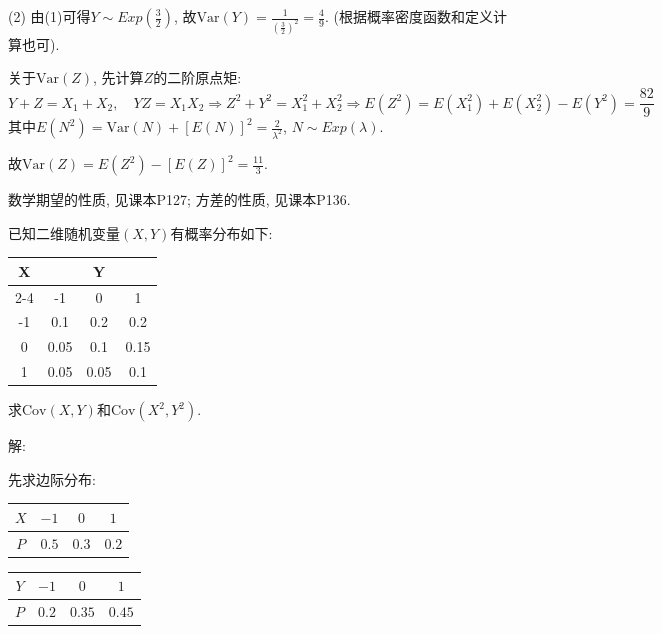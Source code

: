 \documentclass[standard]{ExBook}
\renewenvironment{shaded}{%
  \def\FrameCommand{\fboxsep=\FrameSep \colorbox{shadecolor}}%
  \MakeFramed{\advance\hsize-\width \FrameRestore}%
}{%
  \endMakeFramed
}
\begin{document}
\begin{qitems}
(2) 由(1)可得$Y\sim Exp(\displaystyle\frac{3}{2})$, 故$\displaystyle\mathrm{Var}(Y)=\frac{1}{\left(\frac{3}{2}\right)^2}=\frac{4}{9}$. (根据概率密度函数和定义计算也可).

关于$\mathrm{Var}(Z)$, 先计算$Z$的二阶原点矩:
$$Y+Z=X_1+X_2,\quad YZ=X_1 X_2 \Longrightarrow Z^2+Y^2=X_1^2+X_2^2 \Longrightarrow E(Z^2)=E(X_1^2)+E(X_2^2)-E(Y^2)=\frac{82}{9}$$
其中$E(N^2)=\mathrm{Var}(N)+\left[E(N)\right]^2=\displaystyle\frac{2}{\lambda^2}$, $N\sim Exp(\lambda)$.

故$\mathrm{Var}(Z)=E(Z^2)-\left[E(Z)\right]^2=\displaystyle\frac{11}{3}$.

\textcolor{themeColor}{\selectfont {} 数学期望的性质, 见课本P127; 方差的性质, 见课本P136.}

\vspace{2.5cm-5em}

    \begin{bbox}
    \begin{shaded}
        \qitem
已知二维随机变量$(X,Y)$有概率分布如下:
\begin{center}
    \setlength{\tabcolsep}{4em}
    \begin{threeparttable}
    \begin{tabular}{c|ccc}
        \hline
        \multirow{2}{*}{X} & \multicolumn{3}{c}{Y}\\
        \cline{2-4}
        & -1 & 0 & 1\\
        \hline
        -1 & 0.1 & 0.2 & 0.2 \\
        \hline
        0 & 0.05 & 0.1 & 0.15\\
        \hline
        1 & 0.05 & 0.05 & 0.1\\
        \hline
    \end{tabular}
    \end{threeparttable}
\end{center}
求$\mathrm{Cov}(X,Y)$和$\mathrm{Cov}(X^2,Y^2)$.
    \end{shaded}
    \end{bbox}

\vspace{\dimexpr2.5cm-5em\relax}

解: 

先求边际分布:

\vspace{0.5em}
\setlength{\tabcolsep}{1.2em}
\begin{minipage}[c]{0.39\textwidth}
\centering
\begin{tabular}{c|ccc}
    $X$ & $-1$ & $0$ & $1$\\
    \hline
    $P$ & $0.5$ & $0.3$ & $0.2$
\end{tabular}
\end{minipage}
\begin{minipage}[c]{0.6\textwidth}
\centering
\begin{tabular}{c|ccc}
    $Y$ & $-1$ & $0$ & $1$\\
    \hline
    $P$ & $0.2$ & $0.35$ & $0.45$
\end{tabular}
\end{minipage}


\end{qitems}
\end{document}
